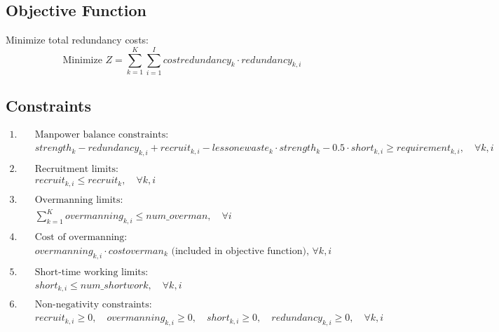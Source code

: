 \documentclass{article}
\begin{document}
\subsection*{Objective Function}
Minimize total redundancy costs:
\[
\text{Minimize } Z = \sum_{k=1}^{K} \sum_{i=1}^{I} costredundancy_{k} \cdot redundancy_{k,i}
\]

\subsection*{Constraints}
\begin{align*}
1. & \quad \text{Manpower balance constraints:} \\
& \quad strength_{k} - redundancy_{k,i} + recruit_{k,i} - lessonewaste_{k} \cdot strength_{k} - 0.5 \cdot short_{k,i} \geq requirement_{k,i}, \quad \forall k, i \\
\\
2. & \quad \text{Recruitment limits:} \\
& \quad recruit_{k,i} \leq recruit_{k}, \quad \forall k, i \\
\\
3. & \quad \text{Overmanning limits:} \\
& \quad \sum_{k=1}^{K} overmanning_{k,i} \leq num\_overman, \quad \forall i \\
\\
4. & \quad \text{Cost of overmanning:} \\
& \quad overmanning_{k,i} \cdot costoverman_{k} \text{ (included in objective function), } \forall k, i \\
\\
5. & \quad \text{Short-time working limits:} \\
& \quad short_{k,i} \leq num\_shortwork, \quad \forall k, i \\
\\
6. & \quad \text{Non-negativity constraints:} \\
& \quad recruit_{k,i} \geq 0, \quad overmanning_{k,i} \geq 0, \quad short_{k,i} \geq 0, \quad redundancy_{k,i} \geq 0, \quad \forall k, i
\end{align*}
\end{document}
